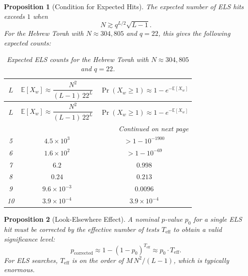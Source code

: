 \documentclass[11pt]{amsart}
\theoremstyle{plain}
\newtheorem{proposition}{Proposition}
\theoremstyle{remark}
\begin{document}
\begin{proposition}[Condition for Expected Hits]
\label{prop:condition}
The expected number of ELS hits exceeds \(1\) when
\begin{equation}
\label{eq:threshold}
N \gtrsim q^{L/2}\sqrt{L-1}.
\end{equation}
For the Hebrew Torah with \(N \approx 304{,}805\) and \(q = 22\), this
gives the following expected counts:
\begin{longtable}{c|c|c}
	\caption{Expected ELS counts for the Hebrew Torah with
		\(N \approx 304{,}805\) and \(q = 22\).}
	\label{tab:torah}\\
	\toprule
	\(L\)
	& \(\mathbb{E}[X_w] \approx \dfrac{N^{2}}{(L-1)\,22^{L}}\)
	& \(\Pr(X_w \ge 1) \approx 1 - e^{-\mathbb{E}[X_w]}\) \\
	\midrule
	\endfirsthead
	
	\toprule
	\(L\)
	& \(\mathbb{E}[X_w] \approx \dfrac{N^{2}}{(L-1)\,22^{L}}\)
	& \(\Pr(X_w \ge 1) \approx 1 - e^{-\mathbb{E}[X_w]}\) \\
	\midrule
	\endhead
	
	\midrule
	\multicolumn{3}{r}{\textit{Continued on next page}} \\
	\endfoot
	
	\bottomrule
	\endlastfoot
	
	5  & \(4.5 \times 10^{3}\)   & \(> 1 - 10^{-1900}\) \\
	6  & \(1.6 \times 10^{2}\)   & \(> 1 - 10^{-69}\) \\
	7  & \(6.2\)                 & \(0.998\) \\
	8  & \(0.24\)                & \(0.213\) \\
	9  & \(9.6 \times 10^{-3}\)  & \(0.0096\) \\
	10 & \(3.9 \times 10^{-4}\)  & \(3.9 \times 10^{-4}\) \\
\end{longtable}
\end{proposition}

\begin{proposition}[Look-Elsewhere Effect]
\label{prop:lookelsewhere}
A nominal \(p\)-value \(p_0\) for a single ELS hit must be corrected by the
effective number of tests \(T_{\text{eff}}\) to obtain a valid significance
level:
\begin{equation}
\label{eq:lookelsewhere}
p_{\text{corrected}} \approx 1 - (1 - p_0)^{T_{\text{eff}}} \approx p_0 \cdot T_{\text{eff}}.
\end{equation}
For ELS searches, \(T_{\text{eff}}\) is on the order of \(M\,N^{2}/(L-1)\),
which is typically enormous.
\end{proposition}
\end{document}

